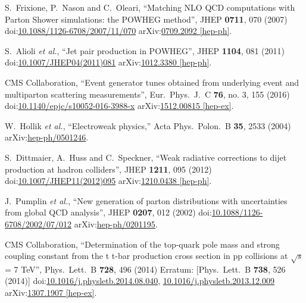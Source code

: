 \begin{thebibliography}{99}
S.~Frixione, P.~Nason and C.~Oleari, ``Matching NLO QCD computations with Parton Shower simulations: the POWHEG method'', JHEP {\bf 0711}, 070 (2007) doi:\href{http://dx.doi.org/10.1088/1126-6708/2007/11/070}{10.1088/1126-6708/2007/11/070} arXiv:\href{https://arxiv.org/abs/0709.2092}{0709.2092 [hep-ph]}.  

S.~Alioli {\it et al.}, ``Jet pair production in POWHEG'', JHEP {\bf 1104}, 081 (2011) doi:\href{http://dx.doi.org/10.1007/JHEP04(2011)081}{10.1007/JHEP04(2011)081} arXiv:\href{https://arxiv.org/abs/1012.3380}{1012.3380 [hep-ph]}.

CMS Collaboration, ``Event generator tunes obtained from underlying event and multiparton scattering measurements'', Eur.\ Phys.\ J.\ C {\bf 76}, no. 3, 155 (2016) doi:\href{http://dx.doi.org/10.1140/epjc/s10052-016-3988-x}{10.1140/epjc/s10052-016-3988-x} arXiv:\href{https://arxiv.org/abs/1512.00815}{1512.00815 [hep-ex]}.
  
W.~Hollik {\it et al.}, ``Electroweak physics,'' Acta Phys.\ Polon.\ B {\bf 35}, 2533 (2004) arXiv:\href{https://arxiv.org/abs/hep-ph/0501246}{hep-ph/0501246}.
    
S.~Dittmaier, A.~Huss and C.~Speckner, ``Weak radiative corrections to dijet production at hadron colliders'', JHEP {\bf 1211}, 095 (2012) doi:\href{http://dx.doi.org/10.1007/JHEP11(2012)095}{10.1007/JHEP11(2012)095} arXiv:\href{https://arxiv.org/abs/1210.0438}{1210.0438 [hep-ph]}.
  

J.~Pumplin {\it et al.}, ``New generation of parton distributions with uncertainties from global QCD analysis'', JHEP {\bf 0207}, 012 (2002) doi:\href{http://dx.doi.org/10.1088/1126-6708/2002/07/012}{10.1088/1126-6708/2002/07/012} arXiv:\href{https://arxiv.org/abs/hep-ph/0201195}{hep-ph/0201195}.
    


 CMS Collaboration, ``Determination of the top-quark pole mass and strong coupling constant from the t t-bar production cross section in pp collisions at $\sqrt{s}$ = 7 TeV'', Phys.\ Lett.\ B {\bf 728}, 496 (2014) Erratum: [Phys.\ Lett.\ B {\bf 738}, 526 (2014)] doi:\href{http://dx.doi.org/10.1016/j.physletb.2014.08.040}{10.1016/j.physletb.2014.08.040}, \href{http://dx.doi.org/10.1016/j.physletb.2013.12.009}{10.1016/j.physletb.2013.12.009} arXiv:\href{https://arxiv.org/abs/1307.1907}{1307.1907 [hep-ex]}.


\end{thebibliography}
